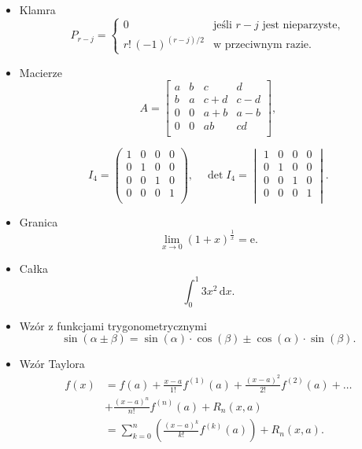 \begin{itemize}
\item Klamra
\begin{equation}
P_{r-j}=\begin{cases}
	0							& \text{jeśli $r-j$ jest nieparzyste},\\
	r!\,(-1)^{(r-j)/2}	& \text{w przeciwnym razie}.
\end{cases}
\end{equation}

\item Macierze
\begin{equation}
A=
	\begin{bmatrix}
		a	&	b	&	c		&	d	\\
		b	&	a	&	c+d	&	c-d	\\
		0	&	0	&	a+b	&	a-b	\\
		0	&	0	&	ab		&	cd	\\
	\end{bmatrix},
\end{equation}

\begin{equation}I_4=
	\begin{pmatrix}
			1 & 0 & 0 & 0 \\
		 	0 & 1 & 0 & 0 \\
			0 & 0 & 1 & 0 \\
			0 & 0 & 0 & 1 \\ 
	\end{pmatrix}
,\quad
\det{I_4}=
	\begin{vmatrix}
			1 & 0 & 0 & 0 \\
		 	0 & 1 & 0 & 0 \\
			0 & 0 & 1 & 0 \\
			0 & 0 & 0 & 1 \\ 
	\end{vmatrix}.
\end{equation}

\item Granica
\begin{equation}
\lim_{x\to 0}(1+x)^{\frac{1}{x}}=\mathrm{e}.
\end{equation}
\item Całka
\begin{equation}
\int_{0}^{1}3x^2\,\mathrm{d}x.
\end{equation}
\item Wzór z funkcjami trygonometrycznymi
\begin{equation}
\sin (\alpha \pm \beta) = \sin (\alpha) \cdot \cos (\beta) \pm \cos (\alpha) \cdot \sin (\beta).
\end{equation} 

\item Wzór Taylora
\begin{equation}
	\begin{split}f(x) &= f(a) + \frac{x-a}{1!} f^{(1)}(a) + \frac{(x-a)^2}{2!} f^{(2)}(a) + \ldots \\
							&+ \frac{(x-a)^n}{n!} f^{(n)}(a) + R_n(x,a)\\
							&= \sum\limits_{k=0}^n \left( \frac{(x-a)^k}{k!} f^{(k)}(a) \right) + R_n(x,a).
	\end{split}
\end{equation}
\end{itemize}
